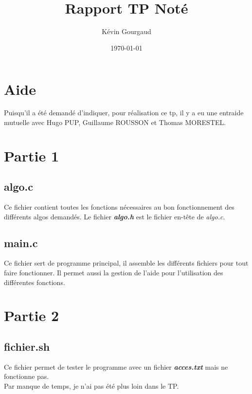 \documentclass[a4paper, 12pt]{article}
\title{Rapport TP Noté}
\author{Kévin Gourgaud }
\date{\today}
\begin{document}
\maketitle

\newpage

\tableofcontents

\newpage

\section{Aide}
Puisqu'il a été demandé d'indiquer, pour réalisation ce tp, il y a eu une entraide mutuelle avec Hugo PUP, Guillaume ROUSSON et Thomas MORESTEL.

\section{Partie 1}
\subsection{algo.c}
Ce fichier contient toutes les fonctions nécessaires au bon fonctionnement des différents algos demandés. Le fichier \textit{\textbf{algo.h}} est le fichier en-tête de \textit{algo.c}.

\subsection{main.c}
Ce fichier sert de programme principal, il assemble les différents fichiers pour tout faire fonctionner. Il permet aussi la gestion de l'aide pour l'utilisation des différentes fonctions.

\section{Partie 2}
\subsection{fichier.sh}
Ce fichier permet de tester le programme avec un fichier \textit{\textbf{acces.txt}} mais ne fonctionne pas.
\\
Par manque de temps, je n'ai pas été plus loin dans le TP.
\end{document}
